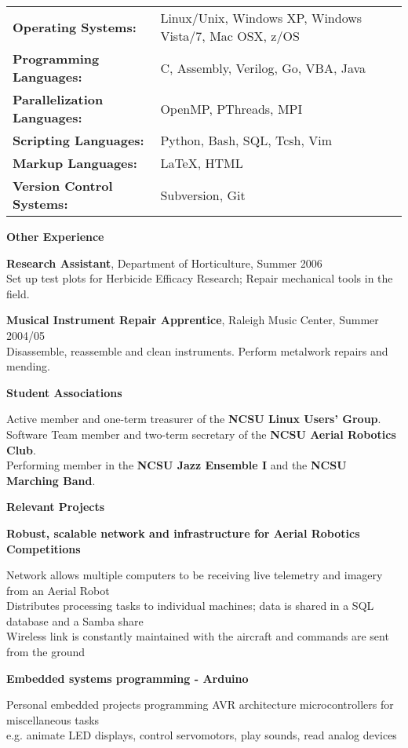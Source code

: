 \documentclass[10pt]{article}
\newcommand{\heading}[2][]{

{\addtolength{\leftskip}{-4em}

\noindent\textbf{\large #2} \textit{#1}

}

}
\newcommand{\subhead}[1]{

{\addtolength{\leftskip}{-2em}

\textbf{#1}

}

}
\begin{document}
{\addtolength{\leftskip}{-.2em}
\begin{tabular}{ l l }
\textbf{Operating Systems:} 				& Linux/Unix, Windows XP, Windows Vista/7, Mac OSX, z/OS\\
\textbf{Programming Languages:} 	        & C, Assembly, Verilog, Go, VBA, Java\\
\textbf{Parallelization Languages:}         & OpenMP, PThreads, MPI \\
\textbf{Scripting Languages:}               & Python, Bash, SQL, Tcsh, Vim \\
\textbf{Markup Languages:} 					& \rmfamily\LaTeX, HTML \\
\textbf{Version Control Systems:}		    & Subversion, Git\\
\end{tabular}
}%
\vspace{.8em}
\heading{\sc Other Experience}
{\setlength{\parindent}{-2em}
\textbf{Research Assistant}, Department of Horticulture, Summer 2006 \\ 
Set up test plots for Herbicide Efficacy Research; Repair mechanical tools in the field.

\textbf{Musical Instrument Repair Apprentice}, Raleigh Music Center, Summer 2004/05 \\
Disassemble, reassemble and clean instruments.  Perform metalwork repairs and mending.
}
\vspace{.8em}
\subhead{Student Associations}
Active member and one-term treasurer of the \textbf{NCSU Linux Users' Group}.\\
Software Team member and two-term secretary of the \textbf{NCSU Aerial Robotics Club}.\\
Performing member in the {\bf NCSU Jazz Ensemble I} and the {\bf NCSU Marching Band}.
\vspace{.8em}
\heading{\sc Relevant Projects}
\subhead{Robust, scalable network and infrastructure for Aerial Robotics Competitions}
Network allows multiple computers to be receiving live telemetry and imagery from an Aerial Robot \\
Distributes processing tasks to individual machines; data is shared in a SQL database and a Samba share \\
Wireless link is constantly maintained with the aircraft and commands are sent from the ground

\subhead{Embedded systems programming - Arduino}
Personal embedded projects programming AVR architecture microcontrollers for miscellaneous tasks \\
e.g. animate LED displays, control servomotors, play sounds, read analog devices
\end{document}

